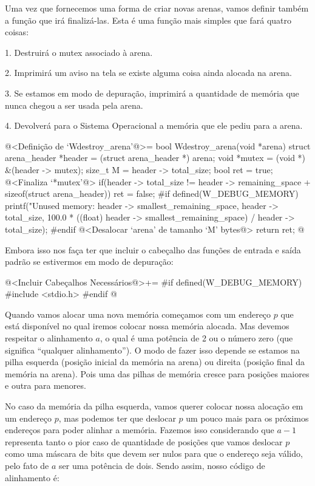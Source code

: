 Uma vez que fornecemos uma forma de criar novas arenas, vamos definir
também a função que irá finalizá-las. Esta é uma função mais simples
que fará quatro coisas:

1. Destruirá o mutex associado à arena.

2. Imprimirá um aviso na tela se existe alguma coisa ainda alocada na
arena.

3. Se estamos em modo de depuração, imprimirá a quantidade de memória
que nunca chegou a ser usada pela arena.

4. Devolverá para o Sistema Operacional a memória que ele pediu para a
arena.

\iniciocodigo
@<Definição de `Wdestroy\_arena'@>=
bool Wdestroy_arena(void *arena){
  struct arena_header *header = (struct arena_header *) arena;
  void *mutex = (void *) &(header -> mutex);
  size_t M = header -> total_size;
  bool ret = true;
  @<Finaliza `*mutex'@>
  if(header -> total_size != header -> remaining_space +
     sizeof(struct arena_header))
    ret = false;
#if defined(W_DEBUG_MEMORY)
  printf("Unused memory: %
         header -> smallest_remaining_space, header -> total_size,
         100.0 *
         ((float) header -> smallest_remaining_space) / header -> total_size);
#endif
  @<Desalocar `arena' de tamanho `M' bytes@>
  return ret;
}
@
\fimcodigo

Embora isso nos faça ter que incluir o cabeçalho das funções de
entrada e saída padrão se estivermos em modo de depuração:

\iniciocodigo
@<Incluir Cabeçalhos Necessários@>+=
#if defined(W_DEBUG_MEMORY)
#include <stdio.h>
#endif
@
\fimcodigo


Quando vamos alocar uma nova memória começamos com um endereço $p$ que
está disponível no qual iremos colocar nossa memória alocada. Mas
devemos respeitar o alinhamento $a$, o qual é uma potência de 2 ou o
número zero (que significa ``qualquer alinhamento''). O modo de fazer
isso depende se estamos na pilha esquerda (posição inicial da memória
na arena) ou direita (posição final da memória na arena). Pois uma das
pilhas de memória cresce para posições maiores e outra para menores.

No caso da memória da pilha esquerda, vamos querer colocar nossa
alocação em um endereço $p$, mas podemos ter que deslocar $p$ um pouco
mais para os próximos endereços para poder alinhar a memória. Fazemos
isso considerando que $a-1$ representa tanto o pior caso de quantidade de
posições que vamos deslocar $p$ como uma máscara de bits que devem ser
nulos para que o endereço seja válido, pelo fato de $a$ ser uma potência de
dois. Sendo assim, nosso código de alinhamento é:


